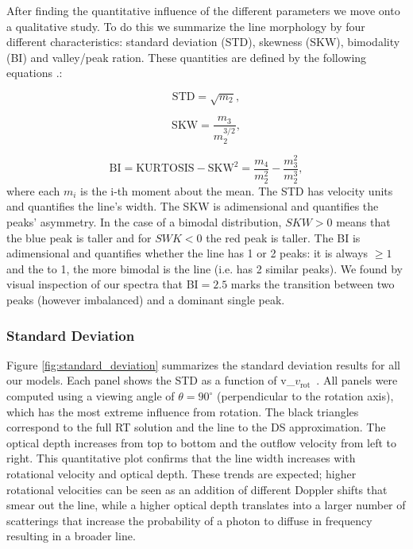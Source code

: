 \documentclass[a4paper,fleqn,usenatbib]{mnras}
\newcommand{\vrot}{\ifmmode v_{\mathrm{rot}}\else $v_{\mathrm{rot}}$~\fi}
\begin{document}
After finding the quantitative influence of the different parameters we
move onto a qualitative study.
To do this we summarize the line morphology by four different
characteristics: standard deviation (STD), skewness (SKW), bimodality
(BI) and valley/peak ration.
These quantities are defined by the following equations \citep{kokoska1999}.:

\begin{equation}
\label{eq:std}
\mathrm{STD} = \sqrt{m_2},
\end{equation}

\begin{equation}
\label{eq:skw}
\mathrm{SKW} = \frac{m_3}{m_2^{3/2}},
\end{equation}

\begin{equation}
\label{eq:bi}
\mathrm{BI} = \mathrm{KURTOSIS} - \mathrm{SKW}^2 = \frac{m_4}{m_2^{2}} - \frac{m_3^2}{m_2^{3}},
\end{equation}
%
where each $m_i$ is the i-th moment about the mean. 
The STD has velocity units and quantifies the line's width.
The SKW is adimensional and quantifies the peaks' asymmetry. 
In the case of a bimodal distribution, $SKW>0$ means that the blue
peak is taller and for $SWK<0$ the red peak is taller. 
The BI is adimensional and quantifies whether the line has 1 or 2
peaks: it is  always $\geq 1$ \citep{Pearson1929} and the 
to 1, the more bimodal is the line (i.e. has 2 similar peaks). 
We found by visual inspection of our spectra that BI$=2.5$ marks the
transition between two peaks (however imbalanced) and a dominant
single peak.


\subsubsection{Standard Deviation}
Figure \ref{fig:standard_deviation} summarizes the standard deviation
results for all our models.
Each panel shows the STD as a function of \vrot.
All panels were computed using a viewing angle of $\theta =
90^{\circ}$ (perpendicular to the rotation axis), which has the most
extreme influence from rotation.
 The black triangles
correspond to the full RT solution and the line to the DS
approximation.  
The optical depth increases from top to bottom and the outflow
velocity from left to right.
This quantitative plot confirms that the line width increases with
rotational velocity and optical depth.
These trends are expected; higher rotational velocities can be seen as
an addition of different Doppler shifts that smear out the line, while
a higher optical depth translates into a larger number of scatterings
that increase the probability of a photon to diffuse in frequency
resulting in a broader line.
\end{document}
